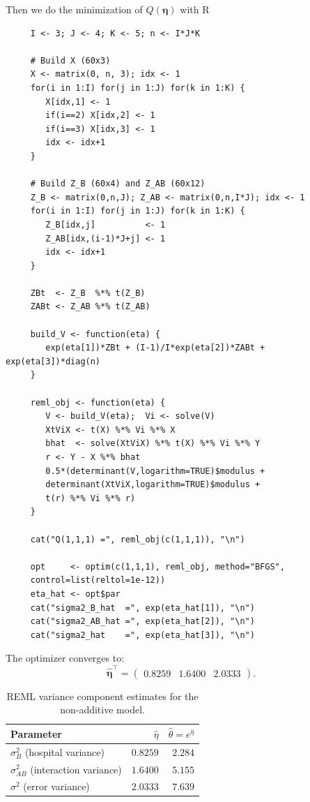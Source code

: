 \documentclass[letterpaper]{article}
\begin{document}
	Then we do the minimization of $Q(\boldsymbol{\eta})$ with R
	\begin{lstlisting}
     I <- 3; J <- 4; K <- 5; n <- I*J*K
     
     # Build X (60x3)
     X <- matrix(0, n, 3); idx <- 1
     for(i in 1:I) for(j in 1:J) for(k in 1:K) {
     	X[idx,1] <- 1
     	if(i==2) X[idx,2] <- 1
     	if(i==3) X[idx,3] <- 1
     	idx <- idx+1
     }
     
     # Build Z_B (60x4) and Z_AB (60x12)
     Z_B <- matrix(0,n,J); Z_AB <- matrix(0,n,I*J); idx <- 1
     for(i in 1:I) for(j in 1:J) for(k in 1:K) {
     	Z_B[idx,j]          <- 1
     	Z_AB[idx,(i-1)*J+j] <- 1
     	idx <- idx+1
     }
     
     ZBt  <- Z_B  %*% t(Z_B)
     ZABt <- Z_AB %*% t(Z_AB)
     
     build_V <- function(eta) {
     	exp(eta[1])*ZBt + (I-1)/I*exp(eta[2])*ZABt + exp(eta[3])*diag(n)
     }
     
     reml_obj <- function(eta) {
     	V <- build_V(eta);  Vi <- solve(V)
     	XtViX <- t(X) %*% Vi %*% X
     	bhat  <- solve(XtViX) %*% t(X) %*% Vi %*% Y
     	r <- Y - X %*% bhat
     	0.5*(determinant(V,logarithm=TRUE)$modulus +
     	determinant(XtViX,logarithm=TRUE)$modulus +
     	t(r) %*% Vi %*% r)
     }
     
     cat("Q(1,1,1) =", reml_obj(c(1,1,1)), "\n")
     
     opt     <- optim(c(1,1,1), reml_obj, method="BFGS",
     control=list(reltol=1e-12))
     eta_hat <- opt$par
     cat("sigma2_B_hat  =", exp(eta_hat[1]), "\n")
     cat("sigma2_AB_hat =", exp(eta_hat[2]), "\n")
     cat("sigma2_hat    =", exp(eta_hat[3]), "\n")
	\end{lstlisting}

	The optimizer converges to:
	\[
	\hat{\boldsymbol{\eta}}^\top = \begin{pmatrix} 0.8259 & 1.6400 & 2.0333 \end{pmatrix}.
	\]
	
	\begin{table}[H]
		\centering
		\begin{tabular}{lrr}
			\toprule
			Parameter & $\hat{\eta}$ & $\hat{\theta} = e^{\hat{\eta}}$ \\
			\midrule
			$\sigma^2_B$  (hospital variance)    & $0.8259$ & $2.284$ \\
			$\sigma^2_{AB}$ (interaction variance) & $1.6400$ & $5.155$ \\
			$\sigma^2$    (error variance)       & $2.0333$ & $7.639$ \\
			\bottomrule
		\end{tabular}
		\caption{REML variance component estimates for the non-additive model.}
	\end{table}
	
\end{document}
